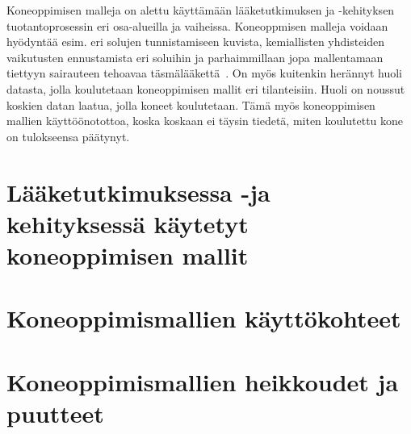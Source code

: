 \documentclass[finnish,twoside,censored,essay,sw-line]{HYthesisML}
\begin{document}
Koneoppimisen malleja on alettu käyttämään lääketutkimuksen ja -kehityksen tuotantoprosessin eri osa-alueilla ja vaiheissa. Koneoppmisen malleja voidaan hyödyntää esim. eri
solujen tunnistamiseen kuvista, kemiallisten yhdisteiden vaikutusten ennustamista eri soluihin ja parhaimmillaan jopa mallentamaan tiettyyn sairauteen tehoavaa täsmälääkettä~\cite{VamathevanJessica2019Aoml}.
On myös kuitenkin herännyt huoli datasta, jolla koulutetaan koneoppimisen mallit eri tilanteisiin. Huoli on noussut koskien datan laatua, jolla koneet koulutetaan. Tämä myös
koneoppimisen mallien käyttöönotottoa, koska koskaan ei täysin tiedetä, miten koulutettu kone on tulokseensa päätynyt.

\chapter{Lääketutkimuksessa -ja kehityksessä käytetyt koneoppimisen mallit}

\chapter{Koneoppimismallien käyttökohteet}

\chapter{Koneoppimismallien heikkoudet ja puutteet}

\cleardoublepage
{}
{}
\printbibliography

\backmatter
\end{document}
